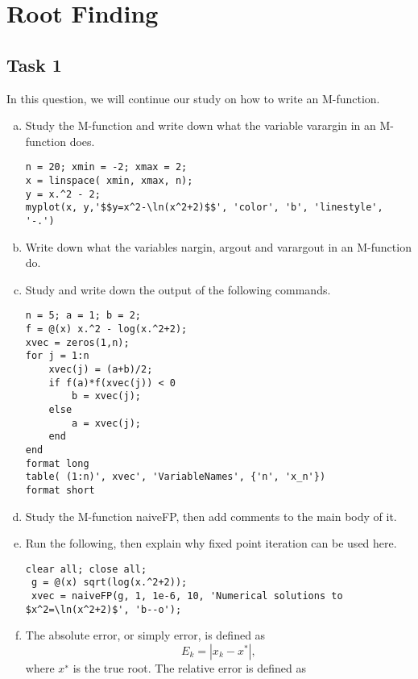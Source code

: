 \chapter{Root Finding}

\section*{Task 1}
In this question, we will continue our study on how to write an M-function.
\begin{enumerate}[(a)]
	\item Study the M-function {\color{blue}{myplot}} and write down what the variable varargin in an M-function does.
	\begin{lstlisting}[style=Matlab-editor]
n = 20; xmin = -2; xmax = 2;
x = linspace( xmin, xmax, n);
y = x.^2 - 2;
myplot(x, y,'$$y=x^2-\ln(x^2+2)$$', 'color', 'b', 'linestyle', '-.')
	\end{lstlisting}
	\item  Write down what the variables {\color{blue} nargin}, {\color{blue} argout} and {\color{blue} varargout} in an M-function do.
	\item  Study and write down the output of the following commands.
	\begin{lstlisting}[style=Matlab-editor]
n = 5; a = 1; b = 2;
f = @(x) x.^2 - log(x.^2+2);
xvec = zeros(1,n);
for j = 1:n
	xvec(j) = (a+b)/2;
	if f(a)*f(xvec(j)) < 0
		b = xvec(j);
	else
		a = xvec(j);
	end
end
format long
table( (1:n)', xvec', 'VariableNames', {'n', 'x_n'})
format short
	\end{lstlisting}
	\item Study the M-function {\color{blue}naiveFP}, then add comments to the main body of it.
	\item Run the following, then explain why fixed point iteration can be used here.
	\begin{lstlisting}[style=Matlab-editor]
 clear all; close all;
 g = @(x) sqrt(log(x.^2+2));
 xvec = naiveFP(g, 1, 1e-6, 10, 'Numerical solutions to $x^2=\ln(x^2+2)$', 'b--o');
	\end{lstlisting}
	\item The absolute error, or simply error, is defined as
	\[ E_k=|x_k-x^*|, \]
	where \(x^∗\) is the true root.
	The relative error is defined as

\end{enumerate}
